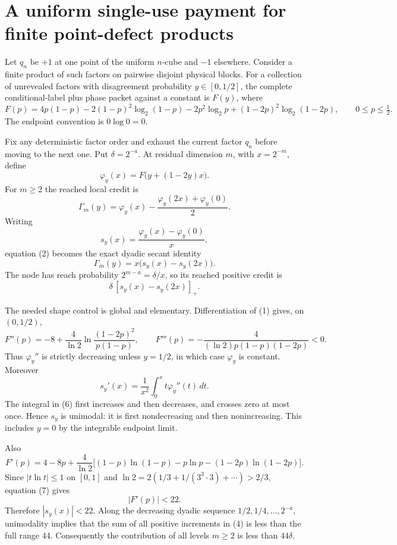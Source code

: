 \section*{A uniform single-use payment for finite point-defect products}

Let $q_n$ be $+1$ at one point of the uniform $n$-cube and $-1$
elsewhere.  Consider a finite product of such factors on pairwise disjoint
physical blocks.  For a collection of unrevealed factors with disagreement
probability $y\in[0,1/2]$, the complete conditional-label plus phase packet
against a constant is $F(y)$, where
\[
 F(p)=4p(1-p)-2(1-p)^2\log_2(1-p)-2p^2\log_2p
 +(1-2p)^2\log_2(1-2p),\qquad 0\le p\le\tfrac12.       \tag{1}
\]
The endpoint convention is $0\log 0=0$.

Fix any deterministic factor order and exhaust the current factor $q_a$
before moving to the next one.  Put $\delta=2^{-a}$.  At residual dimension
$m$, with $x=2^{-m}$, define
\[
 \varphi_y(x)=F\bigl(y+(1-2y)x\bigr).
\]
For $m\ge2$ the reached local credit is
\[
 \Gamma_m(y)=\varphi_y(x)-\frac{\varphi_y(2x)+\varphi_y(0)}2.           \tag{2}
\]
Writing
\[
 s_y(x)=\frac{\varphi_y(x)-\varphi_y(0)}x,
\]
equation (2) becomes the exact dyadic secant identity
\[
 \Gamma_m(y)=x\bigl(s_y(x)-s_y(2x)\bigr).                              \tag{3}
\]
The node has reach probability $2^{m-a}=\delta/x$, so its reached positive
credit is
\[
 \delta\,[s_y(x)-s_y(2x)]_+.                                          \tag{4}
\]

The needed shape control is global and elementary.  Differentiation of (1)
gives, on $(0,1/2)$,
\[
 F''(p)=-8+\frac4{\ln2}\ln\frac{(1-2p)^2}{p(1-p)},
 \qquad
 F'''(p)=-\frac4{(\ln2)p(1-p)(1-2p)}<0.                               \tag{5}
\]
Thus $\varphi_y''$ is strictly decreasing unless $y=1/2$, in which case
$\varphi_y$ is constant.  Moreover
\[
 s_y'(x)=\frac1{x^2}\int_0^x t\varphi_y''(t)\,dt.                     \tag{6}
\]
The integral in (6) first increases and then decreases, and crosses zero at
most once.  Hence $s_y$ is unimodal: it is first nondecreasing and then
nonincreasing.  This includes $y=0$ by the integrable endpoint limit.

Also
\[
 F'(p)=4-8p+\frac4{\ln2}\bigl[(1-p)\ln(1-p)-p\ln p
 -(1-2p)\ln(1-2p)\bigr].                                              \tag{7}
\]
Since $|t\ln t|\le1$ on $[0,1]$ and
$\ln2=2(1/3+1/(3^3\cdot3)+\cdots)>2/3$, equation (7) gives
\[
 |F'(p)|<22.                                                           \tag{8}
\]
Therefore $|s_y(x)|<22$.  Along the decreasing dyadic sequence
$1/2,1/4,\ldots,2^{-a}$, unimodality implies that the sum of all positive
increments in (4) is less than the full range $44$.  Consequently the
contribution of all levels $m\ge2$ is less than $44\delta$.

